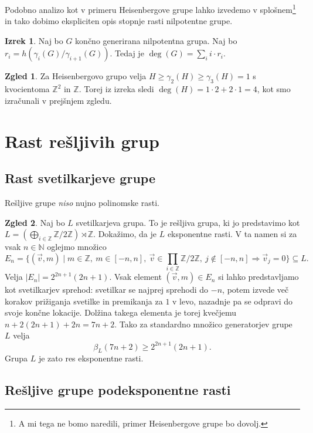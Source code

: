 \documentclass[11pt]{book}
\def\NN{\mathbb{N}}
\def\ZZ{\mathbb{Z}}
\theoremstyle{definition}
\theoremstyle{zgled}
\newtheorem*{zgled}{Zgled}
\theoremstyle{odprtproblem}
\theoremstyle{domacanaloga}
\theoremstyle{izrek}
\newtheorem*{izrek}{Izrek}
\begin{document}
Podobno analizo kot v primeru Heisenbergove grupe lahko izvedemo v splošnem\footnote{A mi tega ne bomo naredili, primer Heisenbergove grupe bo dovolj.} in tako dobimo ekspliciten opis stopnje rasti nilpotentne grupe.

\begin{izrek}
Naj bo $G$ končno generirana nilpotentna grupa. Naj bo $r_i = h(\gamma_i(G) / \gamma_{i+1}(G))$. Tedaj je $\deg(G) = \sum_i i \cdot r_i$.
\end{izrek}

\begin{zgled}
Za Heisenbergovo grupo velja $H \geq \gamma_2(H) \geq \gamma_3(H) = 1$ s kvocientoma $\ZZ^2$ in $\ZZ$. Torej iz izreka sledi $\deg(H) = 1 \cdot 2 + 2 \cdot 1 = 4$, kot smo izračunali v prejšnjem zgledu.
\end{zgled}

\section{Rast rešljivih grup}

\subsection{Rast svetilkarjeve grupe}

Rešljive grupe {\em niso} nujno polinomske rasti.

\begin{zgled}
Naj bo $L$ svetilkarjeva grupa. To je rešljiva grupa, ki jo predstavimo kot $L = (\bigoplus_{i \in \ZZ} \ZZ/2\ZZ) \rtimes \ZZ$. Dokažimo, da je $L$ eksponentne rasti. V ta namen si za vsak $n \in \NN$ oglejmo množico
\[
E_n = \{ (\vec{v}, m) \mid m \in \ZZ, \ m \in [-n, n], \ \vec{v} \in \prod_{i \in \ZZ} \ZZ/2\ZZ, \ j \notin [-n,n] \Rightarrow \vec{v}_j = 0 \} \subseteq L.
\]
Velja $|E_n| = 2^{2n+1} (2n+1)$. Vsak element $(\vec{v}, m) \in E_n$ si lahko predstavljamo kot svetilkarjev sprehod: svetilkar se najprej sprehodi do $- n$, potem izvede več korakov prižiganja svetilke in premikanja za $1$ v levo, nazadnje pa se odpravi do svoje končne lokacije. Dolžina takega elementa je torej kvečjemu $n + 2(2n+1) + 2n = 7n+2$. Tako za standardno množico generatorjev grupe $L$ velja
\[
\beta_L(7n+2) \geq 2^{2n+1}(2n+1).
\]
Grupa $L$ je zato res eksponentne rasti.
\end{zgled}

\subsection{Rešljive grupe podeksponentne rasti}
\end{document}
